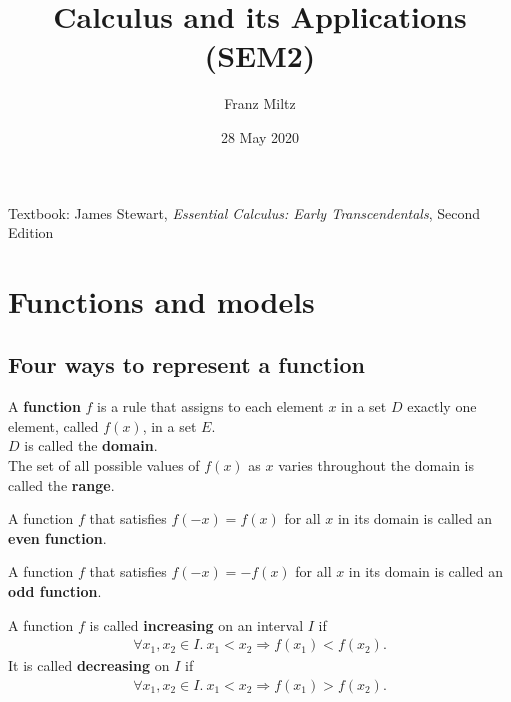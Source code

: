 \documentclass{article}
\begin{document}
\title{Calculus and its Applications (SEM2)}
\author{Franz Miltz}
\date{28 May 2020}
\maketitle
Textbook: James Stewart, \emph{Essential Calculus: Early Transcendentals}, Second Edition
\tableofcontents
\pagebreak
\section{Functions and models}
\subsection{Four ways to represent a function}
\begin{definition}
    A \textbf{function} $f$ is a rule that assigns to each element $x$ in a set $D$ exactly one element, called $f(x)$, in a set $E$.\\
    $D$ is called the \textbf{domain}.\\
    The set of all possible values of $f(x)$ as $x$ varies throughout the domain is called the \textbf{range}.\\
\end{definition}
\begin{definition}
    A function $f$ that satisfies $f(-x)=f(x)$ for all $x$ in its domain is called an \textbf{even function}.
\end{definition}
\begin{definition}
    A function $f$ that satisfies $f(-x)=-f(x)$ for all $x$ in its domain is called an \textbf{odd function}.
\end{definition}
\begin{definition}
    A function $f$ is called \textbf{increasing} on an interval $I$ if
    \begin{align*}
        \forall x_1, x_2 \in I.\:x_1 < x_2 \Rightarrow f(x_1) < f(x_2).
    \end{align*}
    It is called \textbf{decreasing} on $I$ if
    \begin{align*}
        \forall x_1, x_2 \in I.\: x_1 < x_2 \Rightarrow f(x_1) > f(x_2).
    \end{align*}
\end{definition}
\end{document}
